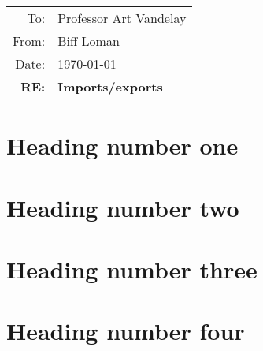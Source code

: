 \documentclass[letterpaper, 11pt]{article}
\begin{document}

\begin{table}[h]
\begingroup
\begin{tabular}{ r l }
	To: & \hspace{0.3cm} Professor Art Vandelay\\
	From: & \hspace{0.3cm} Biff Loman\\
	Date: & \hspace{0.3cm} \today\\
	\textbf{RE:} & \hspace{0.3cm}\textbf{ Imports/exports}
\end{tabular}
\endgroup
\end{table}



\lipsum[66]

\section{Heading number one}

\lipsum [2]

\section{Heading number two}

\lipsum[3-4]

\section{Heading number three}

\lipsum[5]

\section{Heading number four}
 
 \lipsum[6]
\end{document}
